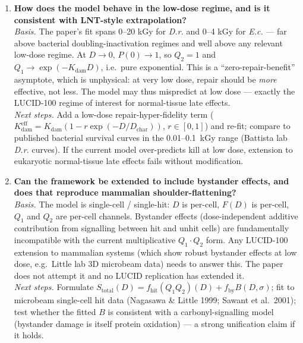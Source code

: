 \begin{enumerate}
\item \textbf{How does the model behave in the low-dose regime, and is it consistent with LNT-style extrapolation?}\\
\emph{Basis.} The paper's fit spans 0--20 kGy for \textit{D.r.} and 0--4 kGy for \textit{E.c.}
--- far above bacterial doubling-inactivation regimes and well above any relevant low-dose
regime. At $D \to 0$, $P(0) \to 1$, so $Q_2 = 1$ and $Q_1 \to \exp(-K_{\text{dam}} D)$, i.e.\
pure exponential. This is a ``zero-repair-benefit'' asymptote, which is unphysical: at very
low dose, repair should be \emph{more} effective, not less. The model may thus mispredict at
low dose --- exactly the LUCID-100 regime of interest for normal-tissue late effects.\\
\emph{Next steps.} Add a low-dose repair-hyper-fidelity term
($K_{\text{dam}}^{\text{eff}} = K_{\text{dam}} (1 - r \exp(-D/D_{\text{char}}))$, $r \in [0,1]$)
and re-fit; compare to published bacterial survival curves in the 0.01--0.1~kGy range
(Battista lab \textit{D.r.} curves). If the current model over-predicts kill at low dose,
extension to eukaryotic normal-tissue late effects fails without modification.

\item \textbf{Can the framework be extended to include bystander effects, and does that reproduce mammalian shoulder-flattening?}\\
\emph{Basis.} The model is single-cell / single-hit: $D$ is per-cell, $F(D)$ is per-cell,
$Q_1$ and $Q_2$ are per-cell channels. Bystander effects (dose-independent additive
contribution from signalling between hit and unhit cells) are fundamentally incompatible with
the current multiplicative $Q_1 \cdot Q_2$ form. Any LUCID-100 extension to mammalian
systems (which show robust bystander effects at low dose, e.g.\ Little lab 3D microbeam
data) needs to answer this. The paper does not attempt it and no LUCID replication has extended
it.\\
\emph{Next steps.} Formulate $S_{\text{total}}(D) = f_{\text{hit}} (Q_1 Q_2)(D) +
f_{\text{by}} B(D, \sigma)$; fit to microbeam single-cell hit data
(Nagasawa \& Little 1999; Sawant et al.\ 2001); test whether the fitted $B$ is consistent with
a carbonyl-signalling model (bystander damage is itself protein oxidation) --- a strong
unification claim if it holds.


\end{enumerate}
